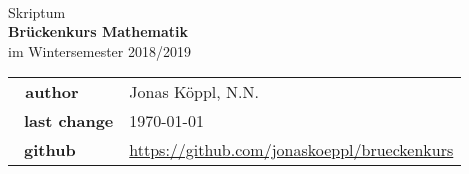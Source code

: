 \documentclass{report}
\theoremstyle{changebreak} %
\numberwithin{theorem}{chapter}
\numberwithin{theorem}{chapter}
\numberwithin{theorem}{chapter}
\numberwithin{theorem}{chapter}
\numberwithin{theorem}{chapter}
\numberwithin{theorem}{chapter}
\begin{document}
\begin{titlepage}
    \ \newline\newline\newline\newline\newline

	\begin{center}

		\huge Skriptum \\
		\Huge\textbf{Brückenkurs Mathematik}\\
		\huge im Wintersemester 2018/2019\\ 
		\normalsize

		\vspace{1cm}
		\begin{tabular}[b]{l|l}
			\textbf{\ author}      & Jonas Köppl, N.N. \\\
            \textbf{last change}   & \today \\\
            \textbf{github}        & \url{https://github.com/jonaskoeppl/brueckenkurs}
		\end{tabular}
		\vspace{1cm}

	\end{center}

\end{titlepage}

\tableofcontents 







\end{document}
